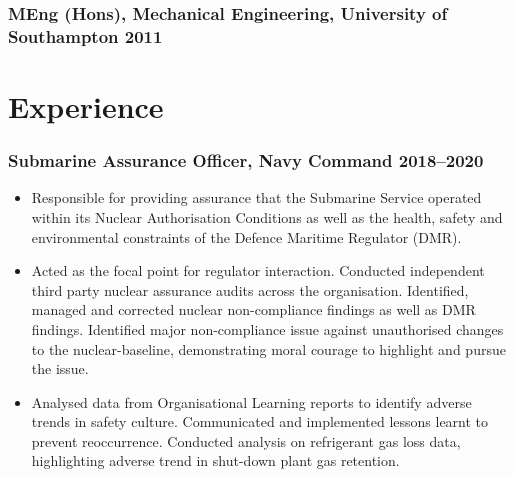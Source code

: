 \documentclass[a4paper, oneside, final, 11pt]{scrartcl} %
\begin{document}
\subsubsection*{MEng (Hons), \textnormal{Mechanical Engineering, University of Southampton} \hfill 2011} 






\section{Experience}

\subsubsection*{Submarine Assurance Officer, Navy Command \hfill 2018--2020}  
\normalfont
\begin{itemize}

\item Responsible for providing
assurance that the Submarine Service operated within its Nuclear Authorisation Conditions as well as the health, safety and environmental constraints of the Defence Maritime Regulator (DMR).

\item Acted as the focal point for regulator interaction. Conducted independent third party nuclear assurance audits across the organisation. Identified, managed and corrected nuclear non-compliance findings as well as DMR findings. Identified major non-compliance issue against unauthorised changes to the nuclear-baseline, demonstrating moral courage to highlight and pursue the issue. 

\item Analysed data from Organisational Learning reports to identify adverse trends in safety culture. Communicated and implemented lessons learnt to prevent reoccurrence. Conducted analysis on refrigerant gas loss data, highlighting adverse trend in shut-down plant gas retention. 

\end{itemize}
\end{document}
